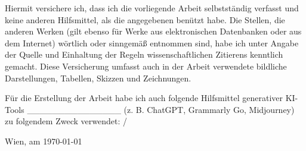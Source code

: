 
Hiermit versichere ich, dass ich die vorliegende Arbeit selbstständig verfasst und keine anderen Hilfsmittel, als die angegebenen benützt habe. Die Stellen, die anderen Werken (gilt ebenso für Werke aus elektronischen Datenbanken oder aus dem Internet) wörtlich oder sinngemäß entnommen sind, habe ich unter Angabe der Quelle und Einhaltung der Regeln wissenschaftlichen Zitierens kenntlich gemacht. Diese Versicherung umfasst auch in der Arbeit verwendete bildliche Darstellungen, Tabellen, Skizzen und Zeichnungen.

Für die Erstellung der Arbeit habe ich auch folgende Hilfsmittel generativer KI-Tools \_\_\_\_\_\_\_\_\_\_\_\_\_\_\_ (z. B. ChatGPT, Grammarly Go, Midjourney) zu folgendem Zweck verwendet: /

\begin{flushleft}
\bigskip{}
Wien, am \today \\
\newcommand{\namesigdate}[2][8cm]{
\vspace{2cm}~\newline
\parbox{#1}{\hrule\centering #2\Large\strut}
\hfill
}

\par\end{flushleft}

